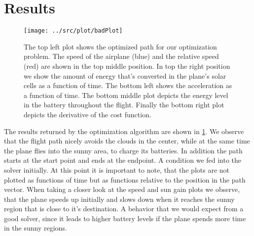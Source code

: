 \section{Results}
\begin{figure}
\centering
\texttt{[image: ../src/plot/badPlot]}
\caption{The top left plot shows the optimized path for our optimization problem. The speed of the airplane (blue) and the relative speed (red) are shown in the top middle position. In top the right position we show the amount of energy that's converted in the plane's solar cells as a function of time. The bottom left shows the acceleration as a function of time. The bottom middle plot depicts the energy level in the battery throughout the flight. Finally the bottom right plot depicts the derivative of the cost function.}
\label{fig:badPlot}
\end{figure}
The results returned by the optimization algorithm are shown in \ref{fig:badPlot}. We observe that the flight path nicely avoids the clouds in the center, while at the same time the plane flies into the sunny area, to charge its batteries. In addition the path starts at the start point and ends at the endpoint. A condition we fed into the solver initially. 
At this point it is important to note, that the plots are not plotted as functions of time but as functions relative to the position in the path vector. When taking a closer look at the speed and sun gain plots we observe, that the plane speeds up initially and slows down when it reaches the sunny region that is close to it's destination. A behavior that we would expect from a good solver, since it leads to higher battery levels if the plane spends more time in the sunny regions.
